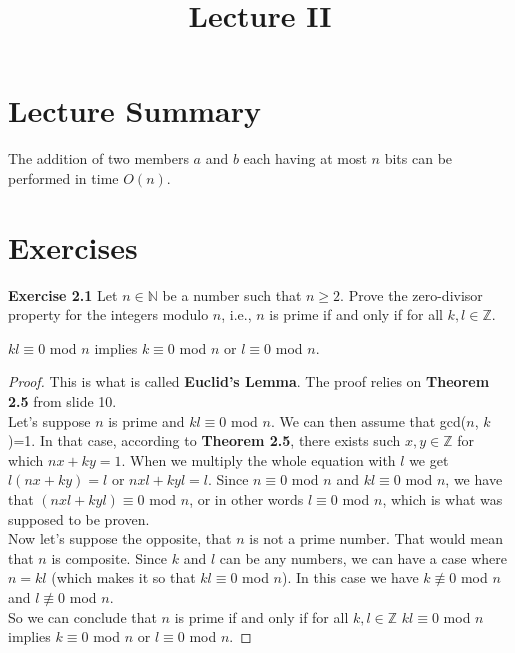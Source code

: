 \documentclass[a4paper]{article}
\title{\vspace{-2cm}Lecture II\vspace{-2cm}}
\date{}
\begin{document}
\maketitle
\section{Lecture Summary}
\begin{theorem}
The addition of two members $a$ and $b$ each having at most $n$ bits can be performed in time $O(n)$.
\end{theorem}



\section{Exercises}
\noindent \textbf{Exercise 2.1} Let $n \in \mathbb{N}$ be a number such that $n \geq 2$. Prove the zero-divisor property for the integers modulo $n$, i.e., $n$ is prime if and only if for all $k, l \in \mathbb{Z}$.
\begin{center}
 $kl \equiv 0$ mod $n$ implies $k \equiv 0$ mod $n$ or $l \equiv 0$ mod $n$.
 \end{center}
\begin{proof}
  This is what is called \textbf{Euclid's Lemma}. The proof relies on \textbf{Theorem 2.5} from slide 10.\\
 Let's suppose $n$ is prime and $kl \equiv 0$ mod $n$. We can then assume that gcd($n$, $k$)=1. In that case, according to \textbf{Theorem 2.5}, there exists such $x, y \in \mathbb{Z}$ for which $nx + ky = 1$. When we multiply the whole equation with $l$ we get $l(nx + ky) = l$ or $nxl + kyl = l$. Since $n \equiv 0$ mod $n$ and $kl \equiv 0$ mod $n$, we have that $(nxl + kyl) \equiv 0$ mod $n$, or in other words $l \equiv 0$ mod $n$, which is what was supposed to be proven.\\
 Now let's suppose the opposite, that $n$ is not a prime number. That would mean that $n$ is composite. Since $k$ and $l$ can be any numbers, we can have a case where $n=kl$ (which makes it so that $kl \equiv 0$ mod $n$). In this case we have $k \not\equiv 0$ mod $n$ and $l \not\equiv 0$ mod $n$. \\
 So we can conclude that $n$ is prime if and only if for all $k, l \in \mathbb{Z}$ $kl \equiv 0$ mod $n$ implies $k \equiv 0$ mod $n$ or $l \equiv 0$ mod $n$.
\end{proof}
\end{document}
